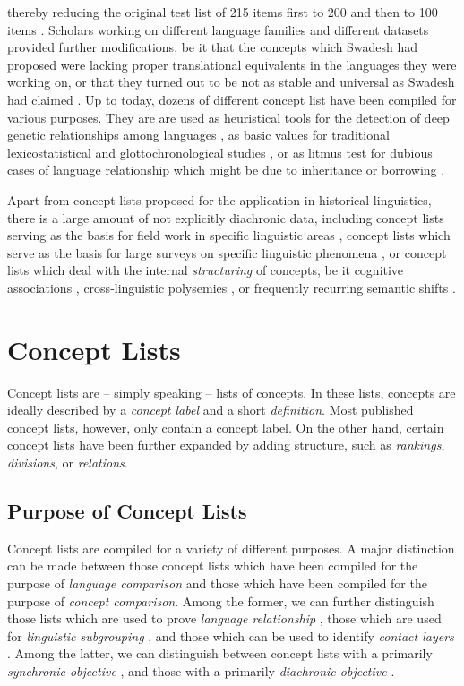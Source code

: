 \documentclass[10pt, a4paper]{article}
\begin{document}
thereby reducing the original test list of 215 items first to 200 \cite{Swadesh1952} and then to 100
items \cite{Swadesh1955}. Scholars working on different language families and different datasets
provided further modifications, be it that the concepts which Swadesh had proposed were lacking
proper translational equivalents in the languages they were working on, or that they
turned out to be not as stable and universal as Swadesh had claimed \cite{Matisoff1978,Alpher1999}. 
Up to today, dozens of different concept list have been compiled for various purposes.
They are are used as heuristical tools for the detection of deep genetic
relationships among languages \cite{Dolgopolsky1964}, 
as basic values for traditional
lexicostatistical and glottochronological studies \cite{Dyen1992,Starostin1991}, 
or as litmus test
for dubious cases of language relationship which might be due to inheritance or borrowing 
\cite{McMahon2005b,Chen1996,Wang2006}. 
 
Apart from concept lists proposed for the application in historical linguistics, there is
a large amount of not explicitly diachronic data, including concept lists serving as the
basis for field work in specific linguistic areas \cite{Kraft1981}, concept lists which serve as the
basis for large surveys on specific linguistic phenomena \cite{Wold2009}, or concept lists which deal with
the internal \emph{structuring} of concepts, be it cognitive associations \cite{Nelson2004},
cross-linguistic polysemies \cite{List2014f}, or frequently recurring semantic shifts
\cite{Bulakh2013}.


\section{Concept Lists}
Concept lists are -- simply speaking -- lists of concepts. In these lists, concepts are ideally
described by a \emph{concept label} and a short \emph{definition}. Most published
concept lists, however, only contain a concept label. On the other hand, certain concept lists have
been further expanded by
adding structure, such as \emph{rankings}, \emph{divisions}, or \emph{relations}.

\subsection{Purpose of Concept Lists}
Concept lists are compiled for a variety of different
purposes. A major distinction can be made between those concept lists which have been compiled for
the
purpose of \emph{language comparison} and those which have been compiled for the purpose of \emph{concept
comparison}. 
Among the former, we can further distinguish those lists which are used to prove \emph{language
relationship} \cite{Dolgopolsky1964}, those which are used for \emph{linguistic subgrouping}
\cite{Norman2003,Starostin1991,Swadesh1955}, and those which can be used to identify \emph{contact
layers} \cite{Chen1996}. Among the latter, we can distinguish between concept lists with a primarily
\emph{synchronic objective} \cite{Hill2014}, and those with a primarily \emph{diachronic objective}
\cite{Wold2009,Bulakh2013}.
\end{document}

